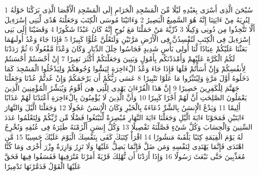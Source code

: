 \documentclass[20pt,a4paper]{article}
\title{}
\author{}
\date{}
\begin{document}
\pagecolor{cl_page}



{\tiny\colorbox{cl_aya}{1}} سُبْحَنَ الَّذِى أَسْرَى بِعَبْدِهِ لَيْلًا مِّنَ الْمَسْجِدِ الْحَرَامِ إِلَى الْمَسْجِدِ الْأَقْصَا الَّذِى بَرَكْنَا حَوْلَهُ لِنُرِيَهُ مِنْ ءَايَتِنَا إِنَّهُ هُوَ السَّمِيعُ الْبَصِيرُ
{\tiny\colorbox{cl_aya}{2}} وَءَاتَيْنَا مُوسَى الْكِتَبَ وَجَعَلْنَهُ هُدًى لِّبَنِى إِسْرَءِيلَ أَلَّا تَتَّخِذُوا مِن دُونِى وَكِيلًا
{\tiny\colorbox{cl_aya}{3}} ذُرِّيَّةَ مَنْ حَمَلْنَا مَعَ نُوحٍ إِنَّهُ كَانَ عَبْدًا شَكُورًا
{\tiny\colorbox{cl_aya}{4}} وَقَضَيْنَا إِلَى بَنِى إِسْرَءِيلَ فِى الْكِتَبِ لَتُفْسِدُنَّ فِى الْأَرْضِ مَرَّتَيْنِ وَلَتَعْلُنَّ عُلُوًّا كَبِيرًا
{\tiny\colorbox{cl_aya}{5}} فَإِذَا جَاءَ وَعْدُ أُولَىهُمَا بَعَثْنَا عَلَيْكُمْ عِبَادًا لَّنَا أُولِى بَأْسٍ شَدِيدٍ فَجَاسُوا خِلَلَ الدِّيَارِ وَكَانَ وَعْدًا مَّفْعُولًا
{\tiny\colorbox{cl_aya}{6}} ثُمَّ رَدَدْنَا لَكُمُ الْكَرَّةَ عَلَيْهِمْ وَأَمْدَدْنَكُم بِأَمْوَلٍ وَبَنِينَ وَجَعَلْنَكُمْ أَكْثَرَ نَفِيرًا
{\tiny\colorbox{cl_aya}{7}} إِنْ أَحْسَنتُمْ أَحْسَنتُمْ لِأَنفُسِكُمْ وَإِنْ أَسَأْتُمْ فَلَهَا فَإِذَا جَاءَ وَعْدُ الْءَاخِرَةِ لِيَسُُٔوا وُجُوهَكُمْ وَلِيَدْخُلُوا الْمَسْجِدَ كَمَا دَخَلُوهُ أَوَّلَ مَرَّةٍ وَلِيُتَبِّرُوا مَا عَلَوْا تَتْبِيرًا
{\tiny\colorbox{cl_aya}{8}} عَسَى رَبُّكُمْ أَن يَرْحَمَكُمْ وَإِنْ عُدتُّمْ عُدْنَا وَجَعَلْنَا جَهَنَّمَ لِلْكَفِرِينَ حَصِيرًا
{\tiny\colorbox{cl_aya}{9}} إِنَّ هَذَا الْقُرْءَانَ يَهْدِى لِلَّتِى هِىَ أَقْوَمُ وَيُبَشِّرُ الْمُؤْمِنِينَ الَّذِينَ يَعْمَلُونَ الصَّلِحَتِ أَنَّ لَهُمْ أَجْرًا كَبِيرًا
{\tiny\colorbox{cl_aya}{10}} وَأَنَّ الَّذِينَ لَا يُؤْمِنُونَ بِالْءَاخِرَةِ أَعْتَدْنَا لَهُمْ عَذَابًا أَلِيمًا
{\tiny\colorbox{cl_aya}{11}} وَيَدْعُ الْإِنسَنُ بِالشَّرِّ دُعَاءَهُ بِالْخَيْرِ وَكَانَ الْإِنسَنُ عَجُولًا
{\tiny\colorbox{cl_aya}{12}} وَجَعَلْنَا الَّيْلَ وَالنَّهَارَ ءَايَتَيْنِ فَمَحَوْنَا ءَايَةَ الَّيْلِ وَجَعَلْنَا ءَايَةَ النَّهَارِ مُبْصِرَةً لِّتَبْتَغُوا فَضْلًا مِّن رَّبِّكُمْ وَلِتَعْلَمُوا عَدَدَ السِّنِينَ وَالْحِسَابَ وَكُلَّ شَىْءٍ فَصَّلْنَهُ تَفْصِيلًا
{\tiny\colorbox{cl_aya}{13}} وَكُلَّ إِنسَنٍ أَلْزَمْنَهُ طَئِرَهُ فِى عُنُقِهِ وَنُخْرِجُ لَهُ يَوْمَ الْقِيَمَةِ كِتَبًا يَلْقَىهُ مَنشُورًا
{\tiny\colorbox{cl_aya}{14}} اقْرَأْ كِتَبَكَ كَفَى بِنَفْسِكَ الْيَوْمَ عَلَيْكَ حَسِيبًا
{\tiny\colorbox{cl_aya}{15}} مَّنِ اهْتَدَى فَإِنَّمَا يَهْتَدِى لِنَفْسِهِ وَمَن ضَلَّ فَإِنَّمَا يَضِلُّ عَلَيْهَا وَلَا تَزِرُ وَازِرَةٌ وِزْرَ أُخْرَى وَمَا كُنَّا مُعَذِّبِينَ حَتَّى نَبْعَثَ رَسُولًا
{\tiny\colorbox{cl_aya}{16}} وَإِذَا أَرَدْنَا أَن نُّهْلِكَ قَرْيَةً أَمَرْنَا مُتْرَفِيهَا فَفَسَقُوا فِيهَا فَحَقَّ عَلَيْهَا الْقَوْلُ فَدَمَّرْنَهَا تَدْمِيرًا
\end{document}
